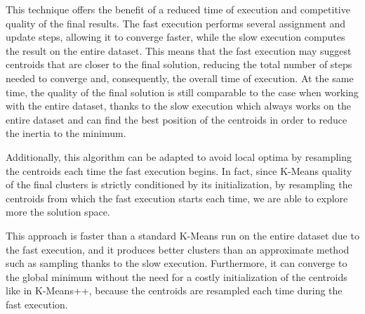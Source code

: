 This technique offers the benefit of a reduced time of execution and competitive quality of the final results.
The fast execution performs several assignment and update steps, allowing it to converge faster, while the slow execution computes the result on the entire dataset. This means that the fast execution may suggest centroids that are closer to the final solution, reducing the total number of steps needed to converge and, consequently, the overall time of execution. 
At the same time, the quality of the final solution is still comparable to the case when working with the entire dataset, thanks to the slow execution which always works on the entire dataset and can find the best position of the centroids in order to reduce the inertia to the minimum.

Additionally, this algorithm can be adapted to avoid local optima by resampling the centroids each time the fast execution begins. In fact, since K-Means quality of the final clusters is strictly conditioned by its initialization, by resampling the centroids from which the fast execution starts each time, we are able to explore more the solution space.

This approach is faster than a standard K-Means run on the entire dataset due to the fast execution, and it produces better clusters than an approximate method such as sampling thanks to the slow execution. Furthermore, it can converge to the global minimum without the need for a costly initialization of the centroids like in K-Means++, because the centroids are resampled each time during the fast execution.